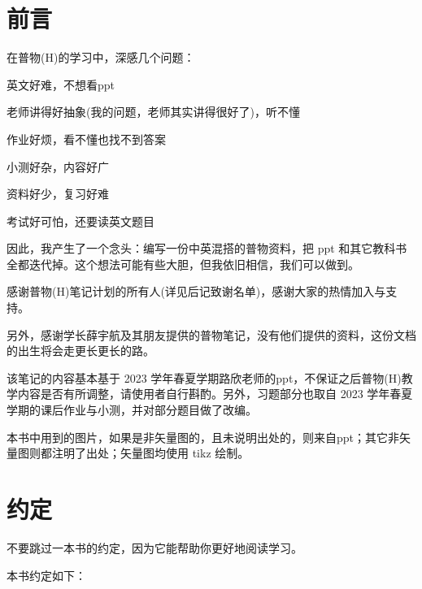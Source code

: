 \chapter{前言}
在普物(H)的学习中，深感几个问题：
\begin{Itemize}
    \item 英文好难，不想看ppt
    \item 老师讲得好抽象(我的问题，老师其实讲得很好了)，听不懂
    \item 作业好烦，看不懂也找不到答案
    \item 小测好杂，内容好广
    \item 资料好少，复习好难
    \item 考试好可怕，还要读英文题目
\end{Itemize}

因此，我产生了一个念头：编写一份中英混搭的普物资料，把 ppt 和其它教科书全都迭代掉。这个想法可能有些大胆，但我依旧相信，我们可以做到。

感谢普物(H)笔记计划的所有人(详见后记致谢名单)，感谢大家的热情加入与支持。

另外，感谢学长薛宇航及其朋友提供的普物笔记，没有他们提供的资料，这份文档的出生将会走更长更长的路。

该笔记的内容基本基于 2023 学年春夏学期路欣老师的ppt，不保证之后普物(H)教学内容是否有所调整，请使用者自行斟酌。另外，习题部分也取自 2023 学年春夏学期的课后作业与小测，并对部分题目做了改编。

本书中用到的图片，如果是非矢量图的，且未说明出处的，则来自ppt；其它非矢量图则都注明了出处；矢量图均使用 tikz 绘制。
\chapter{约定}
不要跳过一本书的约定，因为它能帮助你更好地阅读学习。

本书约定如下：
\setcounter{chapter}{-1}

